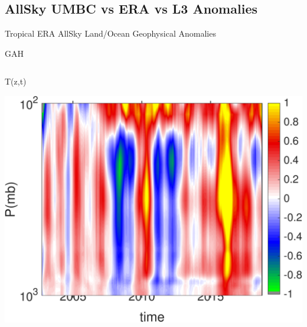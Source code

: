 \documentclass[10pt,t]{beamer}
\begin{document}
\subsection{AllSky UMBC vs ERA vs L3 Anomalies}
\begin{frame}{Tropical ERA AllSky Land/Ocean Geophysical Anomalies}
\vspace{-0.35in}

GAH
\begin{columns}
\begin{column}{0.45\columnwidth}
\begin{block}{\footnotesize T(z,t)}
\vspace{-0.1in}
\begin{center}
\includegraphics[width=\linewidth]{Figs/CloudAnom/Desc_ocean_orig/era_cld_ptemp_anom_200209_201808.png}
\end{center}
\end{block}
\end{column}


\end{columns}
\end{frame}
\end{document}
